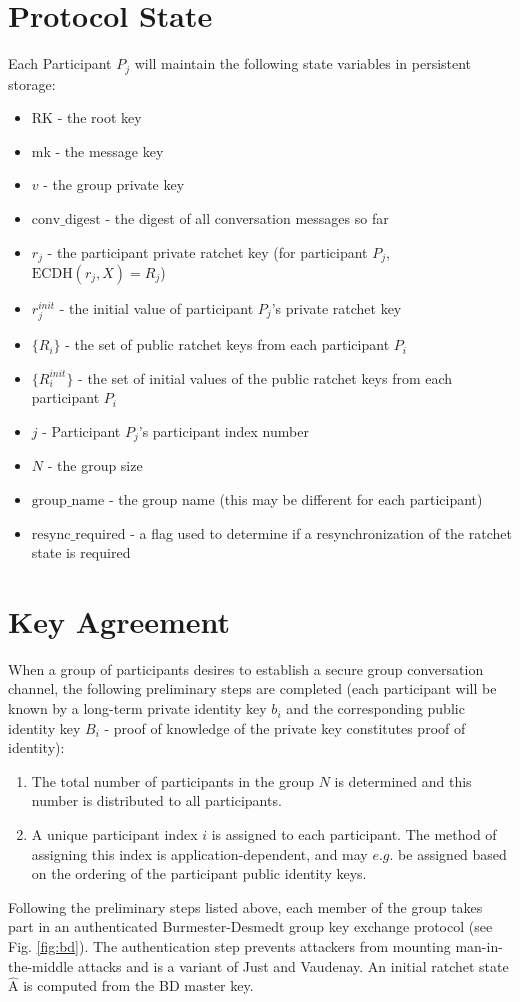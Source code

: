 \documentclass[%
preprint,
amsmath,amssymb,
aps,
prb,
floatfix,
]{revtex4-1}
\begin{document}
\section{\label{sec:protocolstate}Protocol State}
Each Participant $P_j$ will maintain the following state variables in persistent
storage:
\begin{itemize}
\item RK - the root key
\item mk - the message key
\item $v$ - the group private key
\item $\mathrm{conv\_digest}$ - the digest of all conversation messages so far
\item $r_j$ - the participant private ratchet key (for participant $P_j$,
$\mathrm{ECDH}(r_j, X) = R_j$)
\item $r_j^{init}$ - the initial value of participant $P_j$'s private ratchet
key
\item $\{R_i\}$ - the set of public ratchet keys from each participant $P_i$
\item $\{R_i^{init}\}$ - the set of initial values of the public ratchet keys from
each participant $P_i$
\item $j$ - Participant $P_j$'s participant index number
\item $N$ - the group size
\item $\mathrm{group\_name}$ - the group name (this may be different for each participant)
\item $\mathrm{resync\_required}$ - a flag used to determine if a resynchronization of the
ratchet state is required
\end{itemize}

\section{\label{sec:keyagreement}Key Agreement}
When a group of participants desires to establish a secure group conversation
channel, the following preliminary steps are completed (each participant will be
known by a long-term private identity key $b_i$ and the corresponding public identity
key $B_i$ - proof of knowledge of the private key constitutes proof of identity):
\begin{enumerate}
\item The total number of participants in the group $N$ is determined and this
number is distributed to all participants.
\item A unique participant index $i$ is assigned to each participant. The method of
assigning this index is application-dependent, and may $e.g.$ be assigned based
on the ordering of the participant public identity keys.
\end{enumerate}
Following the preliminary steps listed above, each member of the group takes
part in an authenticated Burmester-Desmedt group key exchange protocol (see Fig.
\ref{fig:bd}). The
authentication step prevents attackers from mounting man-in-the-middle attacks
and is a variant of Just and Vaudenay\cite{ref:justvaudenay}.
An initial ratchet state $\mathrm{\hat{A}}$ is computed from the BD master key.
\end{document}
